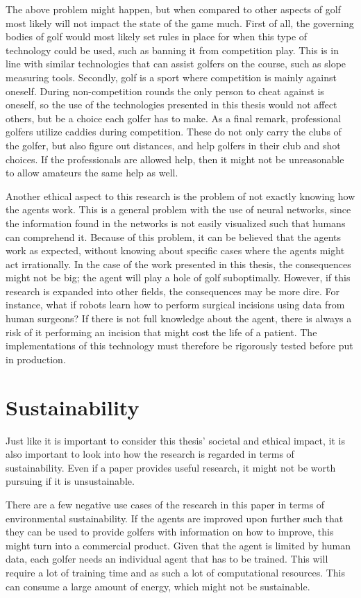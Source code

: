 \documentclass{kththesis}
\begin{document}
The above problem might happen, but when compared to other aspects of golf most likely will not impact the state of the game much. First of all, the governing bodies of golf would most likely set rules in place for when this type of technology could be used, such as banning it from competition play. This is in line with similar technologies that can assist golfers on the course, such as slope measuring tools. Secondly, golf is a sport where competition is mainly against oneself. During non-competition rounds the only person to cheat against is oneself, so the use of the technologies presented in this thesis would not affect others, but be a choice each golfer has to make. As a final remark, professional golfers utilize caddies during competition. These do not only carry the clubs of the golfer, but also figure out distances, and help golfers in their club and shot choices. If the professionals are allowed help, then it might not be unreasonable to allow amateurs the same help as well.

Another ethical aspect to this research is the problem of not exactly knowing how the agents work. This is a general problem with the use of neural networks, since the information found in the networks is not easily visualized such that humans can comprehend it. Because of this problem, it can be believed that the agents work as expected, without knowing about specific cases where the agents might act irrationally. In the case of the work presented in this thesis, the consequences might not be big; the agent will play a hole of golf suboptimally. However, if this research is expanded into other fields, the consequences may be more dire. For instance, what if robots learn how to perform surgical incisions using data from human surgeons? If there is not full knowledge about the agent, there is always a risk of it performing an incision that might cost the life of a patient. The implementations of this technology must therefore be rigorously tested before put in production.

\section{Sustainability}
Just like it is important to consider this thesis' societal and ethical impact, it is also important to look into how the research is regarded in terms of sustainability. Even if a paper provides useful research, it might not be worth pursuing if it is unsustainable.

There are a few negative use cases of the research in this paper in terms of environmental sustainability. If the agents are improved upon further such that they can be used to provide golfers with information on how to improve, this might turn into a commercial product. Given that the agent is limited by human data, each golfer needs an individual agent that has to be trained. This will require a lot of training time and as such a lot of computational resources. This can consume a large amount of energy, which might not be sustainable. 
\end{document}
